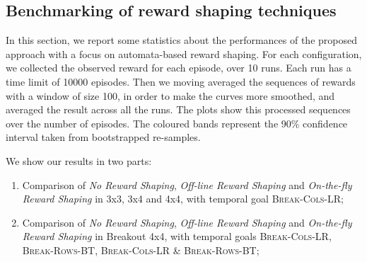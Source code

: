 \subsection{Benchmarking of reward shaping techniques}\label{sect:breakout-benchmarking-rs}
In this section, we report some statistics about the performances of the proposed approach with a focus on automata-based reward shaping.
For each configuration, we collected the observed reward for each episode, over 10 runs. Each run has a time limit of 10000 episodes.
Then we moving averaged the sequences of rewards with a window of size 100, in order to make the curves more smoothed, and averaged the result across all the runs. The plots show this processed sequences over the number of episodes. The coloured bands represent the 90\% confidence interval taken from bootstrapped re-samples.

We show our results in two parts:
\begin{enumerate}
	\item Comparison of \emph{No Reward Shaping}, \emph{Off-line Reward Shaping} and \emph{On-the-fly Reward Shaping} in \Breakout 3x3, 3x4 and 4x4, with temporal goal \textsc{Break-Cols-LR};
	\item Comparison of \emph{No Reward Shaping}, \emph{Off-line Reward Shaping} and \emph{On-the-fly Reward Shaping} in Breakout 4x4, with temporal goals \textsc{Break-Cols-LR}, \textsc{Break-Rows-BT}, \textsc{Break-Cols-LR \& Break-Rows-BT};
\end{enumerate}


